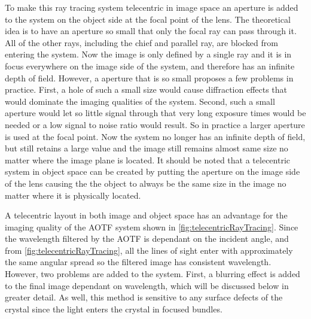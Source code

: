 
To make this ray tracing system telecentric in image space an aperture is added to the system on the object side at the focal point of the lens. The theoretical idea is to have an aperture so small that only the focal ray can pass through it. All of the other rays, including the chief and parallel ray, are blocked from entering the system. Now the image is only defined by a single ray and it is in focus everywhere on the image side of the system, and therefore has an infinite depth of field. However, a aperture that is so small proposes a few problems in practice. First, a hole of such a small size would cause diffraction effects that would dominate the imaging qualities of the system. Second, such a small aperture would let so little signal through that very long exposure times would be needed or a low signal to noise ratio would result. So in practice a larger aperture is used at the focal point. Now the system no longer has an infinite depth of field, but still retains a large value and the image still remains almost same size no matter where the image plane is located. It should be noted that a telecentric system in object space can be created by putting the aperture on the image side of the lens causing the the object to always be the same size in the image no matter where it is physically located.


A telecentric layout in both image and object space has an advantage for the imaging quality of the AOTF system shown in \autoref{fig:telecentricRayTracing}. Since the wavelength filtered by the AOTF is dependant on the incident angle, and from \autoref{fig:telecentricRayTracing}, all the lines of sight enter with approximately the same angular spread so the filtered image has consistent wavelength. However, two problems are added to the system. First, a blurring effect is added to the final image dependant on wavelength, which will be discussed below in greater detail. As well, this method is sensitive to any surface defects of the crystal since the light enters the crystal in focused bundles.

